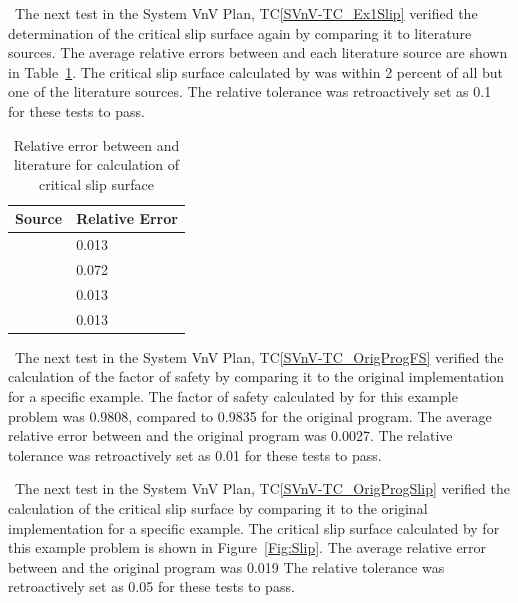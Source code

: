 \documentclass[12pt, titlepage]{article}
\newcommand{\tcref}[1]{TC\ref{#1}}
\begin{document}
~\newline \noindent The next test in the System VnV Plan, 
\tcref{SVnV-TC_Ex1Slip} 
verified the determination of the critical slip surface again by comparing it 
to literature sources. The average relative errors between \progname and each 
literature source are shown in Table~\ref{Table:LitSlip}. The critical slip 
surface calculated by \progname was within 2 percent of all but one of the 
literature sources. The relative tolerance was retroactively set as 0.1 for 
these tests to pass.

\begin{table}[!h]
\begin{tabularx}{1.0\textwidth}{l p{3.5cm}}
	\toprule \textbf{Source} & \textbf{Relative Error}\\ \midrule
	\cite{Greco1996} & 0.013\\
	\cite{MalkawiEtAl} & 0.072\\
	\cite{ChengEtAl} & 0.013\\
	\cite{LiEtAl} & 0.013\\
	\bottomrule
\end{tabularx}
\caption{Relative error between \progname and literature for calculation of 
critical slip surface}
\label{Table:LitSlip}
\end{table}

~\newline \noindent The next test in the System VnV Plan, 
\tcref{SVnV-TC_OrigProgFS} 
verified the calculation of the factor of safety by comparing it to the 
original implementation for a specific example. The factor of safety calculated 
by \progname for this example problem was 0.9808, compared to 0.9835 for the 
original program. The average relative error between \progname and the original 
program was 0.0027. The relative tolerance was retroactively set as 0.01 for 
these tests to pass.

~\newline \noindent The next test in the System VnV Plan, 
\tcref{SVnV-TC_OrigProgSlip} 
verified the calculation of the critical slip surface by comparing it to the 
original implementation for a specific example. The critical slip surface 
calculated by \progname for this example problem is shown in 
Figure~\ref{Fig:Slip}. The average relative error between \progname and the 
original program was 0.019 The relative tolerance was retroactively set as 0.05 
for these tests to pass.
\end{document}
